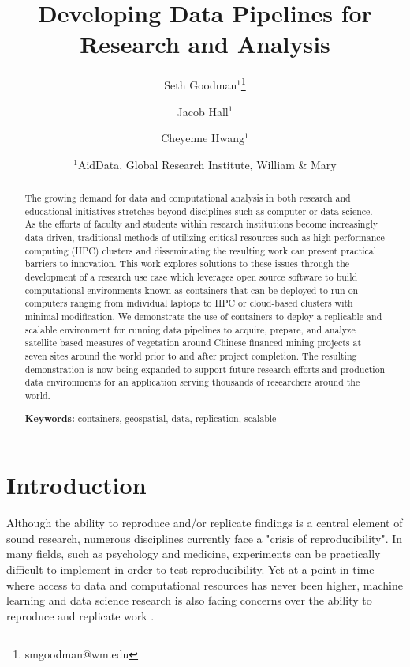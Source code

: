 \documentclass[a4paper]{article}
\title{Developing Data Pipelines for Research and Analysis}
\author{Seth Goodman$^1$\thanks{smgoodman@wm.edu} \and Jacob Hall$^1$ \and Cheyenne Hwang$^1$}
\date{
    $^1$AidData, Global Research Institute, William \& Mary \\ 
}
\begin{document}
\maketitle


\begin{abstract}

The growing demand for data and computational analysis in both research and educational initiatives stretches beyond disciplines such as computer or data science. As the efforts of faculty and students within research institutions become increasingly data-driven, traditional methods of utilizing critical resources such as high performance computing (HPC) clusters and disseminating the resulting work can present practical barriers to innovation. This work explores solutions to these issues through the development of a research use case which leverages open source software to build computational environments known as containers that can be deployed to run on computers ranging from individual laptops to HPC or cloud-based clusters with minimal modification. We demonstrate the use of containers to deploy a replicable and scalable environment for running data pipelines to acquire, prepare, and analyze satellite based measures of vegetation around Chinese financed mining projects at seven sites around the world prior to and after project completion. The resulting demonstration is now being expanded to support future research efforts and production data environments for an application serving thousands of researchers around the world.

\noindent\textbf{Keywords:} containers, geospatial, data, replication, scalable

\end{abstract}


\section{Introduction}

Although the ability to reproduce and/or replicate findings is a central element of sound research, numerous disciplines currently face a "crisis of reproducibility"\citep{Baker2016}. In many fields, such as psychology and medicine, experiments can be practically difficult to implement in order to test reproducibility. Yet at a point in time where access to data and computational resources has never been higher, machine learning and data science research is also facing concerns over the ability to reproduce and replicate work \citep{Ding2020}.
\end{document}
